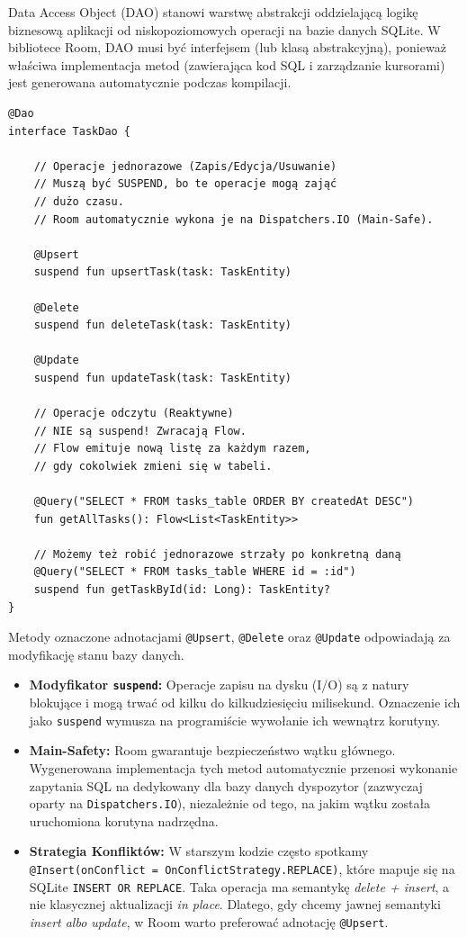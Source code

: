 Data Access Object (DAO) stanowi warstwę abstrakcji oddzielającą logikę biznesową aplikacji od niskopoziomowych operacji na bazie danych SQLite. W bibliotece Room, DAO musi być interfejsem (lub klasą abstrakcyjną), ponieważ właściwa implementacja metod (zawierająca kod SQL i zarządzanie kursorami) jest generowana automatycznie podczas kompilacji.

\begin{verbatim}
@Dao
interface TaskDao {

    // Operacje jednorazowe (Zapis/Edycja/Usuwanie)
    // Muszą być SUSPEND, bo te operacje mogą zająć
    // dużo czasu.
    // Room automatycznie wykona je na Dispatchers.IO (Main-Safe).
    
    @Upsert
    suspend fun upsertTask(task: TaskEntity)

    @Delete
    suspend fun deleteTask(task: TaskEntity)

    @Update
    suspend fun updateTask(task: TaskEntity)

    // Operacje odczytu (Reaktywne)
    // NIE są suspend! Zwracają Flow.
    // Flow emituje nową listę za każdym razem, 
    // gdy cokolwiek zmieni się w tabeli.
    
    @Query("SELECT * FROM tasks_table ORDER BY createdAt DESC")
    fun getAllTasks(): Flow<List<TaskEntity>>

    // Możemy też robić jednorazowe strzały po konkretną daną
    @Query("SELECT * FROM tasks_table WHERE id = :id")
    suspend fun getTaskById(id: Long): TaskEntity?
}
\end{verbatim}

Metody oznaczone adnotacjami \texttt{@Upsert}, \texttt{@Delete} oraz \texttt{@Update} odpowiadają za modyfikację stanu bazy danych.

\begin{itemize}
    \item \textbf{Modyfikator \texttt{suspend}:} Operacje zapisu na dysku (I/O) są z natury blokujące i mogą trwać od kilku do kilkudziesięciu milisekund. Oznaczenie ich jako \texttt{suspend} wymusza na programiście wywołanie ich wewnątrz korutyny.
    \item \textbf{Main-Safety:} Room gwarantuje bezpieczeństwo wątku głównego. Wygenerowana implementacja tych metod automatycznie przenosi wykonanie zapytania SQL na dedykowany dla bazy danych dyspozytor (zazwyczaj oparty na \texttt{Dispatchers.IO}), niezależnie od tego, na jakim wątku została uruchomiona korutyna nadrzędna.
    \item \textbf{Strategia Konfliktów:} W starszym kodzie często spotkamy \texttt{@Insert(onConflict = OnConflictStrategy.REPLACE)}, które mapuje się na SQLite \texttt{INSERT OR REPLACE}. Taka operacja ma semantykę \textit{delete + insert}, a nie klasycznej aktualizacji \textit{in place}. Dlatego, gdy chcemy jawnej semantyki \textit{insert albo update}, w Room warto preferować adnotację \texttt{@Upsert}.
\end{itemize}

